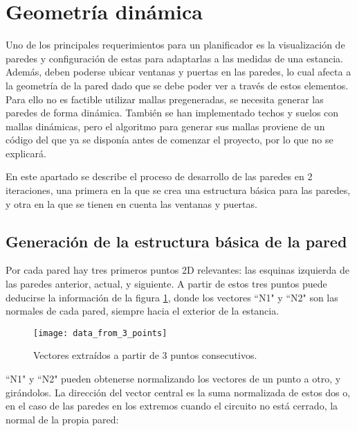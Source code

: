 \section{Geometría dinámica}
\label{walls_holes}
Uno de los principales requerimientos para un planificador es la visualización de paredes y configuración de estas para adaptarlas a las medidas de una estancia. Además, deben poderse ubicar ventanas y puertas en las paredes, lo cual afecta a la geometría de la pared dado que se debe poder ver a través de estos elementos. Para ello no es factible utilizar mallas pregeneradas, se necesita generar las paredes de forma dinámica. También se han implementado techos y suelos con mallas dinámicas, pero el algoritmo para generar sus mallas proviene de un código del que ya se disponía antes de comenzar el proyecto, por lo que no se explicará.

En este apartado se describe el proceso de desarrollo de las paredes en 2 iteraciones, una primera en la que se crea una estructura básica para las paredes, y otra en la que se tienen en cuenta las ventanas y puertas.

\subsection{Generación de la estructura básica de la pared}
\label{subsec:gen1}
Por cada pared hay tres primeros puntos 2D relevantes: las esquinas izquierda de las paredes anterior, actual, y siguiente. A partir de estos tres puntos puede deducirse la información de la figura \ref{fig:wall_vectors}, donde los vectores ``N1" y ``N2" son las normales de cada pared, siempre hacia el exterior de la estancia.

\begin{figure}[H]
    \centering
    \texttt{[image: data\_from\_3\_points]}
    \caption{Vectores extraídos a partir de 3 puntos consecutivos.}
    \label{fig:wall_vectors}
\end{figure}

``N1" y ``N2" pueden obtenerse normalizando los vectores de un punto a otro, y girándolos. La dirección del vector central es la suma normalizada de estos dos o, en el caso de las paredes en los extremos cuando el circuito no está cerrado, la normal de la propia pared:

